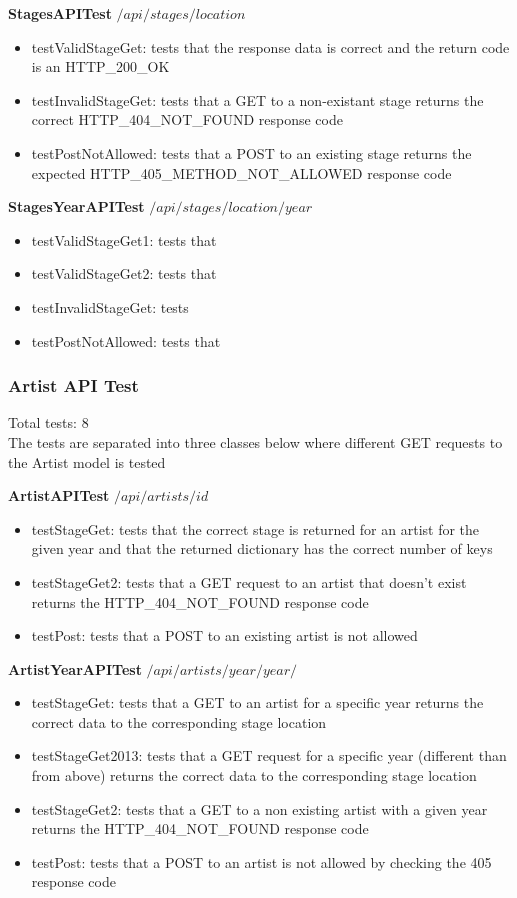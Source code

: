 \documentclass[12pt,english]{scrartcl}
\begin{document}
{\bf StagesAPITest}
$/api/stages/{location}$
\begin{itemize}
 \item testValidStageGet: tests that the response data is correct and the return code is an HTTP\_200\_OK
 \item testInvalidStageGet: tests that a GET to a non-existant stage returns the correct HTTP\_404\_NOT\_FOUND response code
 \item testPostNotAllowed: tests that a POST to an existing stage returns the expected HTTP\_405\_METHOD\_NOT\_ALLOWED response code
\end{itemize}

{\bf StagesYearAPITest}
$/api/stages/{location}/{year}$
\begin{itemize}
 \item testValidStageGet1: tests that 
 \item testValidStageGet2: tests that 
 \item testInvalidStageGet: tests 
 \item testPostNotAllowed: tests that
\end{itemize}


\subsubsection{Artist API Test} 
Total tests: 8 \\
The tests are separated into three classes below where different GET requests to the Artist model is tested

{\bf ArtistAPITest}
$/api/artists/{id}$
\begin{itemize}
 \item testStageGet: tests that the correct stage is returned for an artist for the given year and that the returned dictionary has the 
 correct number of keys
 \item testStageGet2: tests that a GET request to an artist that doesn't exist returns the HTTP\_404\_NOT\_FOUND response code
 \item testPost: tests that a POST to an existing artist is not allowed
\end{itemize}

{\bf ArtistYearAPITest}
$/api/artists/year/{year}/$
\begin{itemize}
 \item testStageGet: tests that a GET to an artist for a specific year returns the correct data to the corresponding stage location
 \item testStageGet2013: tests that a GET request for a specific year (different than from above) returns the correct data to the corresponding stage location
 \item testStageGet2: tests that a GET to a non existing artist with a given year returns the HTTP\_404\_NOT\_FOUND response code
 \item testPost: tests that a POST to an artist is not allowed by checking the 405 response code
\end{itemize}
\end{document}
